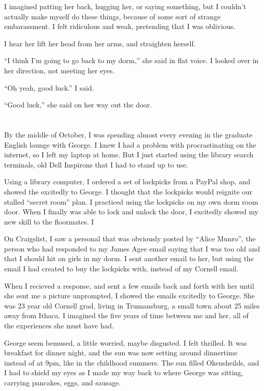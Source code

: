 I imagined patting her back, hugging her, or saying something, but I couldn't
actually make myself do these things, because of some sort of strange
embarassment.  I felt ridiculous and weak, pretending that I was oblivious.

I hear her lift her head from her arms, and straighten herself.

``I think I'm going to go back to my dorm,'' she said in flat voice.  I looked
over in her direction, not meeting her eyes.   

``Oh yeah, good luck.'' I said.

``Good luck,'' she said on her way out the door.


\section{}

By the middle of October, I was spending almost every evening in the graduate
English lounge with George.  I knew I had a problem with procrastinating on the
internet, so I left my laptop at home.  But I just started using the library
search terminals, old Dell Inspirons that I had to stand up to use.  

Using a library computer, I ordered a set of lockpicks from a PayPal shop, and
showed the excitedly to George.  I thought that the lockpicks would reignite our
stalled ``secret room'' plan.  I practiced using the lockpicks on my own dorm
room door.  When I finally was able to lock and unlock the door, I excitedly
showed my new skill to the floormates.  I 

On Craigslist, I saw a personal that was obviously posted by ``Alice Munro'',
the person who had responded to my James Agee email saying that I was too old
and that I should hit on girls in my dorm.  I sent another email to her, but
using the email I had created to buy the lockpicks with, instead of my Cornell
email.

When I recieved a response, and sent a few emails back and forth with her until
she sent me a picture unprompted, I showed the emails excitedly to George.  She
was 23 year old Cornell grad, living in Trumansburg, a small town about 25 miles
away from Ithaca.  I imagined the five years of time between me and her, all of
the experiences she must have had.

George seem bemused, a little worried, maybe disgusted.  I felt thrilled.  It
was breakfast for dinner night, and the sun was now setting around dinnertime
instead of at 9pm, like in the childhood summers.  The sun filled Okensheilds,
and I had to shield my eyes as I made my way back to where George was sitting,
carrying pancakes, eggs, and sausage. 

